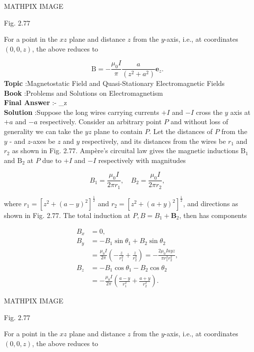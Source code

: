 \documentclass[10pt]{article}
\begin{document}
MATHPIX IMAGE

Fig. $2.77$

For a point in the $x z$ plane and distance $z$ from the $y$-axis, i.e., at coordinates $(0,0, z)$, the above reduces to

$$
\mathrm{B}=-\frac{\mu_{0} I}{\pi} \frac{a}{\left(z^{2}+a^{2}\right)} \mathbf{e}_{z} .
$$
\textbf{Topic} :Magnetostatic Field and Quasi-Stationary Electromagnetic Fields\\
\textbf{Book} :Problems and Solutions on Electromagnetism\\
\textbf{Final Answer} :-  _{z}\\


\textbf{Solution} :Suppose the long wires carrying currents $+I$ and $-I$ cross the $y$ axis at $+a$ and $-a$ respectively. Consider an arbitrary point $P$ and without loss of generality we can take the $y z$ plane to contain $P$. Let the distances of $P$ from the $y$ - and $z$-axes be $z$ and $y$ respectively, and its distances from the wires be $r_{1}$ and $r_{2}$ as shown in Fig. 2.77. Ampère's circuital law gives the magnetic inductions $\mathrm{B}_{1}$ and $\mathrm{B}_{2}$ at $P$ due to $+I$ and $-I$ respectively with magnitudes

$$
B_{1}=\frac{\mu_{0} I}{2 \pi r_{1}}, \quad B_{2}=\frac{\mu_{0} I}{2 \pi r_{2}},
$$

where $r_{1}=\left[z^{2}+(a-y)^{2}\right]^{\frac{1}{2}}$ and $r_{2}=\left[z^{2}+(a+y)^{2}\right]^{\frac{1}{2}}$, and directions as shown in Fig. 2.77. The total induction at $P, B=B_{1}+\mathbf{B}_{2}$, then has components

$$
\begin{aligned}
B_{x} &=0, \\
B_{y} &=-B_{1} \sin \theta_{1}+B_{2} \sin \theta_{2} \\
&=\frac{\mu_{0} I}{2 \pi}\left(-\frac{z}{r_{1}^{2}}+\frac{z}{r_{2}^{2}}\right)=-\frac{2 \mu_{0} I a y z}{\pi r_{1}^{2} r_{2}^{2}}, \\
B_{z} &=-B_{1} \cos \theta_{1}-B_{2} \cos \theta_{2} \\
&=-\frac{\mu_{0} I}{2 \pi}\left(\frac{a-y}{r_{1}^{2}}+\frac{a+y}{r_{2}^{2}}\right) .
\end{aligned}
$$



MATHPIX IMAGE

Fig. $2.77$

For a point in the $x z$ plane and distance $z$ from the $y$-axis, i.e., at coordinates $(0,0, z)$, the above reduces to
\end{document}
